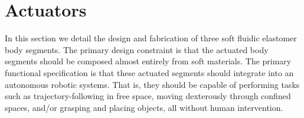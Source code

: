 \section{Actuators}
\label{sec:Actuators}
In this section we detail the design and fabrication of three soft fluidic elastomer body segments.
%
The primary design constraint is that the actuated body segments should be composed almost entirely from soft materials.
%
The primary functional specification is that these actuated segments should integrate into an autonomous robotic systems.
%
That is, they should be capable of performing tasks such as trajectory-following in free space, moving dexterously through confined spaces, and/or grasping and placing objects, all without human intervention.






